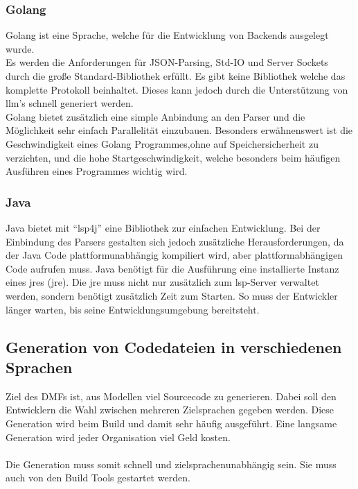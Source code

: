 \documentclass[./einleitung.tex]{subfiles}
\begin{document}
\subsubsection{Golang}
Golang ist eine Sprache, welche für die Entwicklung von Backends ausgelegt wurde. \\
Es werden die Anforderungen für JSON-Parsing, Std-IO und Server Sockets durch die große Standard-Bibliothek erfüllt.
Es gibt keine Bibliothek welche das komplette Protokoll beinhaltet.
Dieses kann jedoch durch die Unterstützung von \acrshort{llm}'s schnell generiert werden.\\
Golang bietet zusätzlich eine simple Anbindung an den Parser und die Möglichkeit sehr einfach Parallelität einzubauen.
Besonders erwähnenswert ist die Geschwindigkeit eines Golang Programmes,ohne auf Speichersicherheit zu verzichten, und die hohe Startgeschwindigkeit, welche besonders beim häufigen Ausführen eines Programmes wichtig wird.

\subsubsection{Java}
Java bietet mit ``lsp4j'' eine Bibliothek zur einfachen Entwicklung.
Bei der Einbindung des Parsers gestalten sich jedoch zusätzliche Herausforderungen, da der Java Code plattformunabhängig kompiliert wird, aber plattformabhängigen Code aufrufen muss.
Java benötigt für die Ausführung eine installierte Instanz eines \acrlong{jre}s (\acrshort{jre}).
Die \acrshort{jre} muss nicht nur zusätzlich zum \acrlong{lsp}-Server verwaltet werden, sondern benötigt zusätzlich Zeit zum Starten.
So muss der Entwickler länger warten, bis seine Entwicklungsumgebung bereitsteht.


\subsection{Generation von Codedateien in verschiedenen Sprachen}
Ziel des DMFs ist, aus Modellen viel Sourcecode zu generieren.
Dabei soll den Entwicklern die Wahl zwischen mehreren Zielsprachen gegeben werden.
Diese Generation wird beim Build und damit sehr häufig ausgeführt.
Eine langsame Generation wird jeder Organisation viel Geld kosten.
\\\\
Die Generation muss somit schnell und zielsprachenunabhängig sein.
Sie muss auch von den Build Tools gestartet werden.
\end{document}
